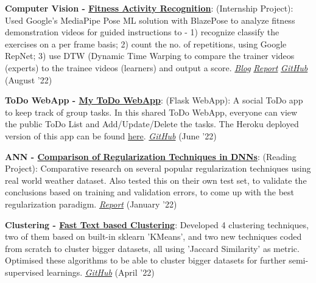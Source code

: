 \documentclass[a4paper,20pt]{article}
\newcommand{\resumeItem}[2]{
  \item\small{
    \textbf{#1}{: #2 \vspace{-2pt}}
  }
}
\newcommand{\resumeSubItem}[2]{\resumeItem{#1}{#2}\vspace{-3pt}}
\begin{document}
\resumeSubItem{Computer Vision - \href{https://sampadk04.github.io/post/project-9/}{Fitness Activity Recognition}}{(Internship Project): Used Google's MediaPipe Pose ML solution with BlazePose to analyze fitness demonstration videos for guided instructions to - 1) recognize classify the exercises on a per frame basis; 2) count the no. of repetitions, using Google RepNet; 3) use DTW (Dynamic Time Warping to compare the trainer videos (experts) to the trainee videos (learners) and output a score. \textit{\href{https://www.launchpad.ai/blog/fitness-activity-recognition-using-mediapipe-blazepose}{Blog}} \textit{\href{https://github.com/sampadk04/fitness-activity-recognition/blob/main/Report.pdf}{Report}} \textit{\href{https://github.com/sampadk04/fitness-activity-recognition}{GitHub}} (August '22)}
\vspace{2pt}

\resumeSubItem{ToDo WebApp - \href{https://sampadk04.github.io/post/project-7/}{My ToDo WebApp}}{(Flask WebApp): A social ToDo app to keep track of group tasks. In this shared ToDo WebApp, everyone can view the public ToDo List and Add/Update/Delete the tasks. The Heroku deployed version of this app can be found \href{https://webappmytodo.herokuapp.com/}{here}. \textit{\href{https://github.com/sampadk04/myToDo}{GitHub}} (June '22)}
\vspace{2pt}

\resumeSubItem{ANN - \href{https://sampadk04.github.io/post/project-0/}{Comparison of Regularization Techniques in DNNs}}{(Reading Project): Comparative research on several popular regularization techniques using real world weather dataset. Also tested this on their own test set, to validate the conclusions based on training and validation errors, to come up with the best regularization paradigm. \textit{\href{https://drive.google.com/file/d/1IdB25eOe6ux7u2mR4tHNifdWi-Pfh87G/view?usp=sharing}{Report}} (January '22)}
\vspace{2pt}

\resumeSubItem{Clustering - \href{https://sampadk04.github.io/post/project-6/}{Fast Text based Clustering}}{Developed 4 clustering techniques, two of them based on built-in sklearn 'KMeans', and two new techniques coded from scratch to cluster bigger datasets, all using 'Jaccard Similarity' as metric. Optimised these algorithms to be able to cluster bigger datasets for further semi-supervised learnings. \textit{\href{https://github.com/sampadk04/Fast_Text_based_Clustering}{GitHub}} (April '22)}
\vspace{2pt}
\end{document}
